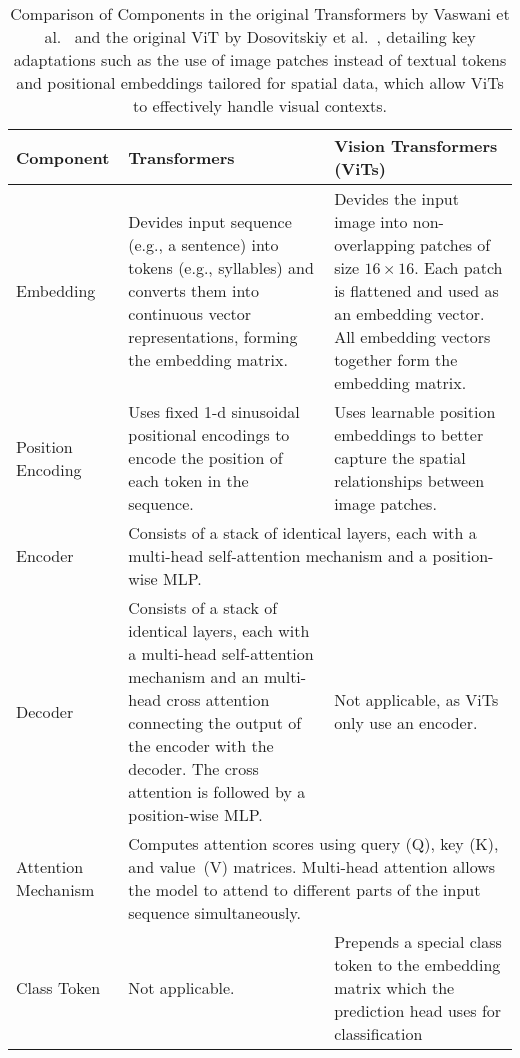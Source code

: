 
\begin{table}[h!]
    \centering
    \begin{tabular}{|p{3cm}|p{5.5cm}|p{5.5cm}|}
    \hline
    \textbf{Component} & \textbf{Transformers} & \textbf{Vision Transformers (ViTs)} \\ \hline
    Embedding & Devides input sequence (e.g., a sentence) into tokens (e.g., syllables) and converts them into continuous vector representations, forming the embedding matrix. & Devides the input image into non-overlapping patches of size $16 \times 16$. Each patch is flattened and used as an embedding vector. All embedding vectors together form the embedding matrix.\\ \hline
    Position Encoding & Uses fixed 1-d sinusoidal positional encodings to encode the position of each token in the sequence.& Uses learnable position embeddings to better capture the spatial relationships between image patches.\\ \hline
    Encoder & \multicolumn{2}{p{11cm}|}{Consists of a stack of identical layers, each with a multi-head self-attention mechanism and a position-wise MLP.}\\ \hline
    Decoder & Consists of a stack of identical layers, each with a multi-head self-attention mechanism and an multi-head cross attention connecting the output of the encoder with the decoder. The cross attention is followed by a position-wise MLP. & Not applicable, as ViTs only use an encoder.\\ \hline
    Attention Mechanism & \multicolumn{2}{p{11cm}|}{Computes attention scores using query (Q), key (K), and value~(V) matrices. Multi-head attention allows the model to attend to different parts of the input sequence simultaneously.}\\ \hline
    Class Token & Not applicable. & Prepends a special class token to the embedding matrix which the prediction head uses for classification\\ \hline
    \end{tabular}
    \caption[Comparison of ViT and Transformer Architecture]{Comparison of Components in the original Transformers by Vaswani et al.~\cite{Vaswani2017} and the original ViT by Dosovitskiy et al.~\cite{Dosovitskiy2020}, detailing key adaptations such as the use of image patches instead of textual tokens and positional embeddings tailored for spatial data, which allow ViTs to effectively handle visual contexts.}
\end{table}
